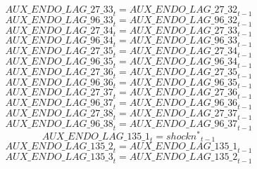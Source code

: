 \begin{dmath}
{AUX\_ENDO\_LAG\_27\_33}_{t}={AUX\_ENDO\_LAG\_27\_32}_{t-1}
\end{dmath}
\begin{dmath}
{AUX\_ENDO\_LAG\_96\_33}_{t}={AUX\_ENDO\_LAG\_96\_32}_{t-1}
\end{dmath}
\begin{dmath}
{AUX\_ENDO\_LAG\_27\_34}_{t}={AUX\_ENDO\_LAG\_27\_33}_{t-1}
\end{dmath}
\begin{dmath}
{AUX\_ENDO\_LAG\_96\_34}_{t}={AUX\_ENDO\_LAG\_96\_33}_{t-1}
\end{dmath}
\begin{dmath}
{AUX\_ENDO\_LAG\_27\_35}_{t}={AUX\_ENDO\_LAG\_27\_34}_{t-1}
\end{dmath}
\begin{dmath}
{AUX\_ENDO\_LAG\_96\_35}_{t}={AUX\_ENDO\_LAG\_96\_34}_{t-1}
\end{dmath}
\begin{dmath}
{AUX\_ENDO\_LAG\_27\_36}_{t}={AUX\_ENDO\_LAG\_27\_35}_{t-1}
\end{dmath}
\begin{dmath}
{AUX\_ENDO\_LAG\_96\_36}_{t}={AUX\_ENDO\_LAG\_96\_35}_{t-1}
\end{dmath}
\begin{dmath}
{AUX\_ENDO\_LAG\_27\_37}_{t}={AUX\_ENDO\_LAG\_27\_36}_{t-1}
\end{dmath}
\begin{dmath}
{AUX\_ENDO\_LAG\_96\_37}_{t}={AUX\_ENDO\_LAG\_96\_36}_{t-1}
\end{dmath}
\begin{dmath}
{AUX\_ENDO\_LAG\_27\_38}_{t}={AUX\_ENDO\_LAG\_27\_37}_{t-1}
\end{dmath}
\begin{dmath}
{AUX\_ENDO\_LAG\_96\_38}_{t}={AUX\_ENDO\_LAG\_96\_37}_{t-1}
\end{dmath}
\begin{dmath}
{AUX\_ENDO\_LAG\_135\_1}_{t}={{shockn^*}}_{t-1}
\end{dmath}
\begin{dmath}
{AUX\_ENDO\_LAG\_135\_2}_{t}={AUX\_ENDO\_LAG\_135\_1}_{t-1}
\end{dmath}
\begin{dmath}
{AUX\_ENDO\_LAG\_135\_3}_{t}={AUX\_ENDO\_LAG\_135\_2}_{t-1}
\end{dmath}
